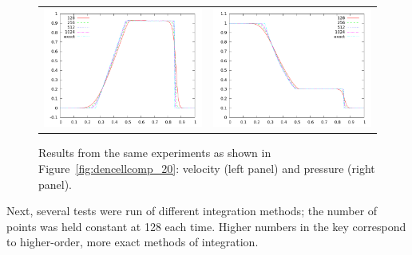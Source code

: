 \documentclass[10pt]{article}
\begin{document}
\begin{figure}
  \begin{center}
    \begin{tabular}{cc}
      \includegraphics[width=.475\textwidth]{velcellcomp_20} &
      \includegraphics[width=.475\textwidth]{prscellcomp_20}
    \end{tabular}
  \end{center}
  \caption{Results from the same experiments as shown in Figure~\ref{fig:dencellcomp_20}:
  velocity (left panel) and pressure (right panel).}
  \label{fig:pvcellcomp}
\end{figure}

    
Next, several tests were run of different integration methods; the number of points was held constant at 128 each time. Higher numbers in the key correspond to higher-order, more exact methods of integration. 
\end{document}
